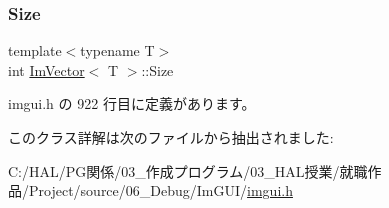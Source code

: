 \subsubsection{\texorpdfstring{Size}{Size}}
{\footnotesize\ttfamily template$<$typename T$>$ \\
int \mbox{\hyperlink{class_im_vector}{Im\+Vector}}$<$ T $>$\+::Size}



 imgui.\+h の 922 行目に定義があります。



このクラス詳解は次のファイルから抽出されました\+:\begin{DoxyCompactItemize}
\item 
C\+:/\+H\+A\+L/\+P\+G関係/03\+\_\+作成プログラム/03\+\_\+\+H\+A\+L授業/就職作品/\+Project/source/06\+\_\+\+Debug/\+Im\+G\+U\+I/\mbox{\hyperlink{imgui_8h}{imgui.\+h}}\end{DoxyCompactItemize}
